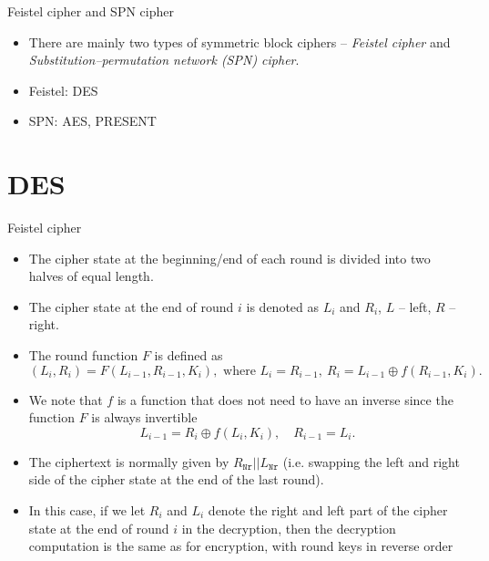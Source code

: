 \begin{frame}{Feistel cipher and SPN cipher}
\begin{itemize}
    \item There are mainly two types of symmetric block ciphers -- \textit{Feistel cipher} and \textit{Substitution–permutation network (SPN) cipher}.
    \item Feistel: DES
    \item SPN: AES, PRESENT
\end{itemize} 
\end{frame}

\section{DES}
\begin{frame}{\VideoName}
    \tableofcontents[currentsection]
\end{frame}

\begin{frame}{Feistel cipher}
    \begin{itemize}
        \item The cipher state at the beginning/end of each round is divided into two halves of equal length.
        \item The cipher state at the end of round $i$ is denoted as $L_i$ and $R_i$, $L$ -- left, $R$ -- right.
        \item The round function $F$ is defined as 
\begin{equation*}
    (L_i, R_i)=F(L_{i-1},R_{i-1}, K_i), \text{ where } L_i=R_{i-1},\  R_i=L_{i-1}\oplus f(R_{i-1}, K_i).
\end{equation*}
\item We note that $f$ is a function that does not need to have an inverse since the function $F$ is always invertible
\[
L_{i-1}=R_i\oplus f(L_i,K_i),\quad R_{i-1}=L_i.
\]
\item The ciphertext is normally given by $R_{\texttt{Nr}}||L_{\texttt{Nr}}$ (i.e. swapping the left and right side of the cipher state at the end of the last round).
\item In this case, if we let $R_i$ and $L_i$ denote the right and left part of the cipher state at the end of round $i$ in the decryption, then the decryption computation is the same as for encryption, with round keys in reverse order
    \end{itemize}
\end{frame}

